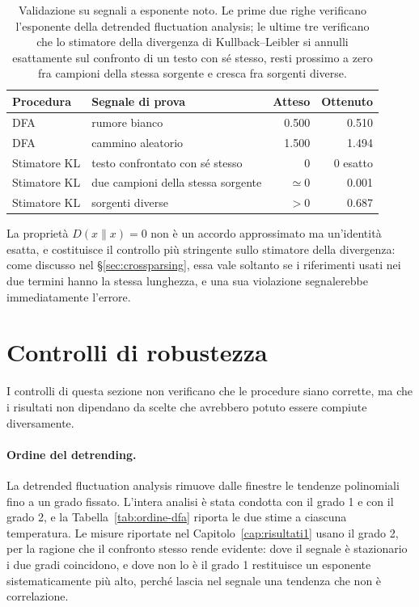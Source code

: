 \begin{table}[htbp]
\centering
\small
\begin{tabular}{@{}l>{\raggedright\arraybackslash}p{5.6cm}rr@{}}
\toprule
Procedura & Segnale di prova & Atteso & Ottenuto \\
\midrule
DFA & rumore bianco & 0.500 & 0.510 \\
DFA & cammino aleatorio & 1.500 & 1.494 \\
Stimatore KL & testo confrontato con sé stesso & 0 & $0$ esatto \\
Stimatore KL & due campioni della stessa sorgente & $\simeq 0$ & 0.001 \\
Stimatore KL & sorgenti diverse & $> 0$ & 0.687 \\
\bottomrule
\end{tabular}
\caption{Validazione su segnali a esponente noto. Le prime due righe verificano
l'esponente della detrended fluctuation analysis; le ultime tre verificano che
lo stimatore della divergenza di Kullback--Leibler si annulli esattamente sul
confronto di un testo con sé stesso, resti prossimo a zero fra campioni della
stessa sorgente e cresca fra sorgenti diverse.}
\label{tab:validazione}
\end{table}

La proprietà $D(x\|x) = 0$ non è un accordo approssimato ma un'identità esatta,
e costituisce il controllo più stringente sullo stimatore della divergenza:
come discusso nel §\ref{sec:crossparsing}, essa vale soltanto se i riferimenti
usati nei due termini hanno la stessa lunghezza, e una sua violazione
segnalerebbe immediatamente l'errore.

\section{Controlli di robustezza}
\label{sec:robustezza}

I controlli di questa sezione non verificano che le procedure siano corrette, ma
che i risultati non dipendano da scelte che avrebbero potuto essere compiute
diversamente.

\paragraph{Ordine del detrending.}
La detrended fluctuation analysis rimuove dalle finestre le tendenze polinomiali
fino a un grado fissato. L'intera analisi è stata condotta con il grado 1 e con
il grado 2, e la Tabella~\ref{tab:ordine-dfa} riporta le due stime a ciascuna
temperatura. Le misure riportate nel Capitolo~\ref{cap:risultati1} usano il
grado 2, per la ragione che il confronto stesso rende evidente: dove il segnale
è stazionario i due gradi coincidono, e dove non lo è il grado 1 restituisce un
esponente sistematicamente più alto, perché lascia nel segnale una tendenza che
non è correlazione.

